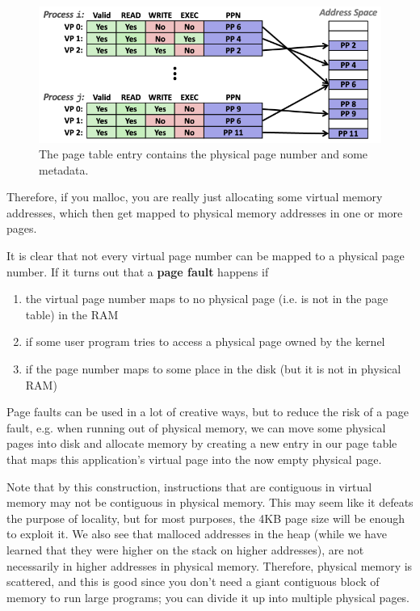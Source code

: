 \documentclass{article}
\begin{document}
\begin{definition}
\begin{enumerate}
      \end{enumerate}
      \begin{figure}[H]
        \centering 
        \includegraphics[scale=0.4]{img/permissions_vm.png}
        \caption{The page table entry contains the physical page number and some metadata.} 
        \label{fig:permissions_vm}
      \end{figure}
    \end{definition}

    Therefore, if you malloc, you are really just allocating some virtual memory addresses, which then get mapped to physical memory addresses in one or more pages. 

    \begin{definition}
      It is clear that not every virtual page number can be mapped to a physical page number. If it turns out that a \textbf{page fault} happens if 
      \begin{enumerate}
        \item the virtual page number maps to no physical page (i.e. is not in the page table) in the RAM
        \item if some user program tries to access a physical page owned by the kernel
        \item if the page number maps to some place in the disk (but it is not in physical RAM)
      \end{enumerate}
      Page faults can be used in a lot of creative ways, but to reduce the risk of a page fault, e.g. when running out of physical memory, we can move some physical pages into disk and allocate memory by creating a new entry in our page table that maps this application's virtual page into the now empty physical page. 
    \end{definition}

    Note that by this construction, instructions that are contiguous in virtual memory may not be contiguous in physical memory. This may seem like it defeats the purpose of locality, but for most purposes, the 4KB page size will be enough to exploit it. We also see that malloced addresses in the heap (while we have learned that they were higher on the stack on higher addresses), are not necessarily in higher addresses in physical memory. Therefore, physical memory is scattered, and this is good since you don't need a giant contiguous block of memory to run large programs; you can divide it up into multiple physical pages. 
\end{document}
